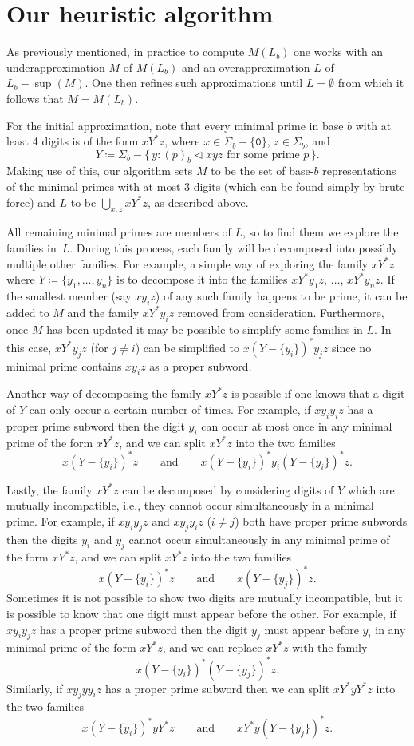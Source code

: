 \documentclass[12pt]{article}
\def\subw{\mathrel{\triangleleft}}
\theoremstyle{plain}
\theoremstyle{definition}
\theoremstyle{remark}
\newcommand{\0}{\mathtt{0}}
\newcommand{\1}{\mathtt{1}}
\newcommand{\2}{\mathtt{2}}
\newcommand{\3}{\mathtt{3}}
\newcommand{\4}{\mathtt{4}}
\newcommand{\5}{\mathtt{5}}
\newcommand{\6}{\mathtt{6}}
\newcommand{\7}{\mathtt{7}}
\newcommand{\8}{\mathtt{8}}
\newcommand{\9}{\mathtt{9}}
\newcommand{\set}[2]{\{\,#1{}:{}#2\,\}}
\begin{document}
\section{Our heuristic algorithm}

As previously mentioned, in practice to compute $M(L_b)$ one works with an underapproximation
$M$ of $M(L_b)$ and an overapproximation $L$ of $L_b-\sup(M)$.
One then refines such approximations until $L=\emptyset$ from which it follows that $M=M(L_b)$.

For the initial approximation, note that every minimal prime in base $b$ with at least 4
digits is of the form $x Y^* z$, where $x\in\Sigma_b-\{\0\}$, $z\in\Sigma_b$, and
\[ Y \coloneqq \Sigma_b - \set{y}{\text{$(p)_b\subw xyz$ for some prime $p$}} . \]
Making use of this, our algorithm sets $M$ to be the set of base-$b$ representations
of the minimal primes with at most $3$ digits (which can be found simply by brute force)
and $L$ to be $\bigcup_{x,z}xY^*z$, as described above.

All remaining minimal primes are members of $L$, so to find them we explore the families in~$L$.
During this process, each family will be decomposed into possibly multiple other families.
For example, a simple way of exploring the family $xY^*z$ where $Y\coloneqq\{y_1,\dotsc,y_n\}$ is to decompose it
into the families $xY^*y_1z$, $\dotsc$, $xY^*y_nz$.  If the smallest member (say $xy_iz$)
of any such family happens to be prime, it can be added to $M$ and the family
$xY^*y_iz$ removed from consideration.  Furthermore, once $M$ has been updated it may be possible
to simplify some families in $L$.  In this case, $xY^*y_jz$ (for $j\neq i$) can be simplified to
$x(Y-\{y_i\})^*y_jz$ since no minimal prime contains $xy_iz$ as a proper subword.

Another way of decomposing %
the family $xY^*z$ is possible if one knows that a digit of $Y$ can only occur a certain number
of times.  For example, if $xy_iy_iz$ has a proper prime subword then the digit $y_i$
can occur at most once in any minimal prime of the form $xY^*z$, and we can split $xY^*z$ into
the two families
\[ x(Y-\{y_i\})^*z \qquad\text{and}\qquad x(Y-\{y_i\})^*y_i(Y-\{y_i\})^*z .\]

Lastly, the family $xY^*z$ can be decomposed by considering digits of $Y$ which are mutually incompatible,
i.e., they cannot occur simultaneously in a minimal prime.  For example, if $xy_iy_jz$ and $xy_jy_iz$ ($i\neq j$)
both have proper prime subwords then the digits $y_i$ and $y_j$ cannot occur simultaneously in any minimal
prime of the form $xY^*z$, and we can split $xY^*z$ into the two families
\[ x(Y-\{y_i\})^*z \qquad\text{and}\qquad x(Y-\{y_j\})^*z . \]
Sometimes it is not possible to show two digits are mutually incompatible, but it is possible to know that
one digit must appear before the other.  For example, if $xy_iy_jz$ has a proper prime subword then the digit
$y_j$ must appear before $y_i$ in any minimal prime of the form $xY^*z$, and we can replace $xY^*z$
with the family
\[ x(Y-\{y_i\})^*(Y-\{y_j\})^*z . \]
Similarly, if $xy_jyy_iz$ has a proper prime subword then we can split $xY^*yY^*z$ into the two families
\[ x(Y-\{y_i\})^*yY^*z \qquad\text{and}\qquad xY^*y(Y-\{y_j\})^*z . \]
\end{document}

